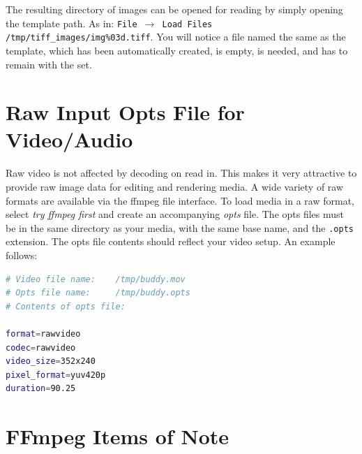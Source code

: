 The resulting directory of images can be opened for reading by simply opening the template path.  As in: \texttt{File $\rightarrow$ Load Files} \texttt{/tmp/tiff\_images/img\%03d.tiff}.  You will notice a file named the same as the template, which has been automatically created, is empty, is needed, and has to remain with the set.

\section{Raw Input Opts File for Video/Audio}%
\label{sec:raw_input_opts_video_audio}

Raw video is not affected by decoding on read in.  This makes it very attractive to provide raw image data for editing and rendering media.  A wide variety of raw formats are available via the ffmpeg file interface.  To load media in a raw format, select \textit{try ffmpeg first} and create an accompanying \textit{opts} file.  The opts files must be in the same directory as your media, with the same base name, and the \texttt{.opts} extension.  The opts file contents should reflect your video setup.  An example follows:

\begin{lstlisting}[language=bash,numbers=none]
# Video file name:    /tmp/buddy.mov
# Opts file name:     /tmp/buddy.opts
# Contents of opts file:

format=rawvideo
codec=rawvideo
video_size=352x240
pixel_format=yuv420p
duration=90.25
\end{lstlisting}

\section{FFmpeg Items of Note}%
\label{sec:ffmpeg_items_note}

